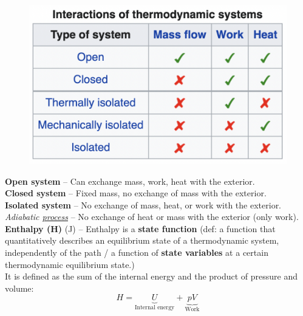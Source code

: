 \documentclass[a4paper,11pt]{article}
\begin{document}
\begin{figure}[ht]
    \centering
    \includegraphics[width=.5\linewidth]{figures/interactions.png}
\end{figure}
\noindent
\textbf{Open system} -- Can exchange mass, work, heat with the exterior.\\
\textbf{Closed system} -- Fixed mass, no exchange of mass with the exterior.\\
\textbf{Isolated system} -- No exchange of mass, heat, or work with the exterior.\\
\emph{Adiabatic \underline{process}} -- No exchange of heat or mass with the exterior (only work).\\

\textbf{Enthalpy (H) } (J) -- Enthalpy is a \textbf{state function} (def: a function that quantitatively describes an equilibrium state of a thermodynamic system, independently of the path / a function of \textbf{state variables} at a certain thermodynamic equilibrium state.)\\
It is defined as the sum of the internal energy and the product of pressure and volume:
\[H = \underbrace{U}_\textrm{Internal energy} + \underbrace{pV}_\textrm{Work}\]
\end{document}
